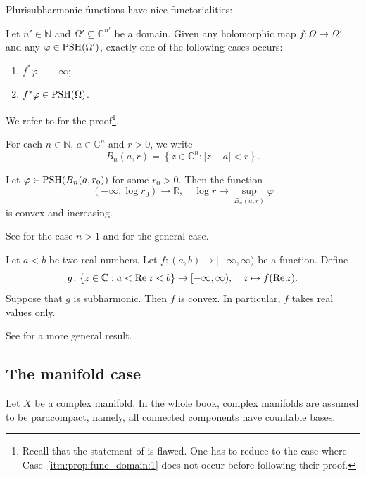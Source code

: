 Plurisubharmonic functions have nice functorialities:
\begin{proposition}\label{prop:func_domain}
    Let $n'\in \mathbb{N}$ and $\Omega'\subseteq \mathbb{C}^{n'}$ be a domain. Given any holomorphic map $f\colon \Omega\rightarrow \Omega'$ and any $\varphi\in \mathrm{PSH}(\Omega')$, exactly one of the following cases occurs:
    \begin{enumerate}
        \item\label{itm:prop:func_domain:1} $f^*\varphi\equiv -\infty$;
        \item\label{itm:prop:func_domain:2} $f^*\varphi\in \mathrm{PSH}(\Omega)$.
    \end{enumerate}
\end{proposition}
We refer to \cite[Proposition~1.44]{GZ17} for the proof\footnote{Recall that the statement of \cite[Proposition~1.44]{GZ17} is flawed. One has to reduce to the case where Case~\ref{itm:prop:func_domain:1} does not occur before following their proof.}.

For each $n\in \mathbb{N}$, $a\in \mathbb{C}^n$ and $r>0$, we write
\begin{equation}\label{eq:Bnar}
B_n(a,r)=\left\{ z\in \mathbb{C}^n: |z-a|<r \right\}.
\end{equation}
\begin{proposition}\label{prop:ballpshconvex}
    Let $\varphi\in \mathrm{PSH}(B_n(a,r_0))$ for some $r_0>0$. Then the function
    \[
    (-\infty,\log r_0)\rightarrow \mathbb{R},\quad \log r\mapsto \sup_{B_n(a,r)}\varphi
    \]
    is convex and increasing.
\end{proposition}
See \cite[Theorem~4.1.13]{Hor07} for the case $n>1$ and \cite[Corollary~2.4]{Bou17} for the general case.

\begin{proposition}\label{prop:subhimplyconv}
Let $a<b$ be two real numbers.
    Let $f\colon (a,b)\rightarrow [-\infty,\infty)$ be a function. Define
    \[
    g\colon \{z\in \mathbb{C}:a<\operatorname{Re} z<b\}\rightarrow [-\infty,\infty),\quad z\mapsto f(\operatorname{Re} z).
    \]
    Suppose that $g$ is subharmonic. Then $f$ is convex. In particular, $f$ takes real values only.
\end{proposition}

See \cite[Theorem~2.12]{HK76} for a more general result.

\subsection{The manifold case}
\label{subsec:psh_manifold}
Let $X$ be a complex manifold. In the whole book, complex manifolds are assumed to be paracompact, namely, all connected components have countable bases.


